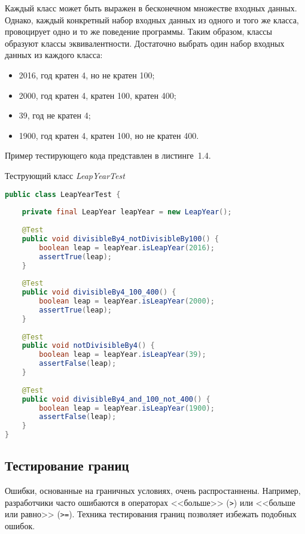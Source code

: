 Каждый класс может быть выражен в бесконечном множестве входных данных. Однако, каждый конкретный набор входных данных из одного и того же класса, провоцирует одно и то же поведение программы. Таким образом, классы образуют классы эквивалентности. Достаточно выбрать один набор входных данных из каждого класса:

 \begin{itemize}
	\item 2016, год кратен 4, но не кратен 100;
	\item 2000, год кратен 4, кратен 100, кратен 400;
	\item 39, год не кратен 4;
	\item 1900, год кратен 4, кратен 100, но не кратен 400.
\end{itemize}

Пример тестирующего кода представлен в листинге~1.4.

\begin{ListingEnv}[!h]%
	\captiondelim{ } %
	\caption{Теструющий класс \textit{LeapYearTest}}
	\begin{lstlisting}[language={Java}]
public class LeapYearTest {
	
	private final LeapYear leapYear = new LeapYear();
	
	@Test
	public void divisibleBy4_notDivisibleBy100() {
		boolean leap = leapYear.isLeapYear(2016);
		assertTrue(leap);
	}
	
	@Test
	public void divisibleBy4_100_400() {
		boolean leap = leapYear.isLeapYear(2000);
		assertTrue(leap);
	}
	
	@Test
	public void notDivisibleBy4() {
		boolean leap = leapYear.isLeapYear(39);
		assertFalse(leap);
	}
	
	@Test
	public void divisibleBy4_and_100_not_400() {
		boolean leap = leapYear.isLeapYear(1900);
		assertFalse(leap);
	}
}
	\end{lstlisting}
\end{ListingEnv}%



\subsection{Тестирование границ} 
 
Ошибки, основанные на граничных условиях, очень распростаннены. Например, разработчики часто ошибаются в операторах <<больше>> (\texttt{>}) или <<больше или равно>> (\texttt{>=}). Техника тестирования границ позволяет избежать подобных ошибок.

